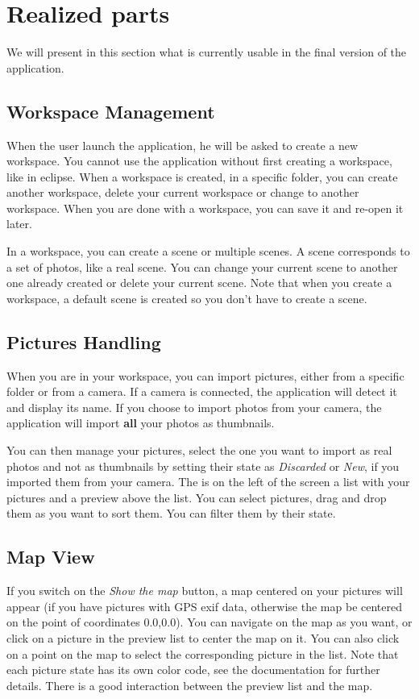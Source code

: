 \section{Realized parts}
We will present in this section what is currently usable in the final version of the application.
\subsection*{Workspace Management}
When the user launch the application, he will be asked to create a new workspace. You cannot use the application without first creating a workspace, like in eclipse. 
When a workspace is created, in a specific folder, you can create another workspace, delete your current workspace or change to another workspace. When you are done with
a workspace, you can save it and re-open it later.

In a workspace, you can create a scene or multiple scenes. A scene corresponds to a set of photos, like a real scene. You can change your current scene to another one already created or delete your current scene. Note
that when you create a workspace, a default scene is created so you don't have to create a scene.

\subsection*{Pictures Handling}
When you are in your workspace, you can import pictures, either from a specific folder or from a camera. If a camera is connected, the application will detect it and display its name. If you choose to import photos from
your camera, the application will import \textbf{all} your photos as thumbnails. 

You can then manage your pictures, select the one you want to import as real photos and not as thumbnails by setting their state as \textit{Discarded} or \textit{New}, if you imported them from your camera. The is on 
the left of the screen a list with your pictures and a preview above the list. You can select pictures, drag and drop them as you want to sort them. You can filter them by their state.

\subsection*{Map View}
If you switch on the \textit{Show the map} button, a map centered on your pictures will appear (if you have pictures with GPS exif data, otherwise the map be centered on the point of coordinates 0.0,0.0). You can 
navigate on the map as you want, or click on a picture in the preview list to center the map on it. You can also click on a point on the map to select the corresponding picture in the list. Note that each picture state has
its own color code, see the documentation for further details. There is a good interaction between the preview list and the map. 

